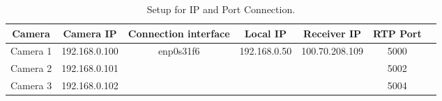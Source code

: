 \begin{table}[H]
    \centering
    \caption{Setup for IP and Port Connection.}\label{tab:IP_and_port_Connection}
    \begin{tabular}{|c|c|c|c|c|c|c|}
    \hline
    Camera & Camera IP & Connection interface & Local IP  & Receiver IP & RTP Port\\
    \hline
    Camera 1 & 192.168.0.100 & \multirow{3}{*}{enp0s31f6} & \multirow{3}{*}{192.168.0.50} & \multirow{3}{*}{100.70.208.109} & 5000\\
    \cline{1-2}\cline{6-6}
    Camera 2 & 192.168.0.101 & & & & 5002\\
    \cline{1-2}\cline{6-6}
    Camera 3 & 192.168.0.102 & & & & 5004\\
    \hline
    \end{tabular}
\end{table}